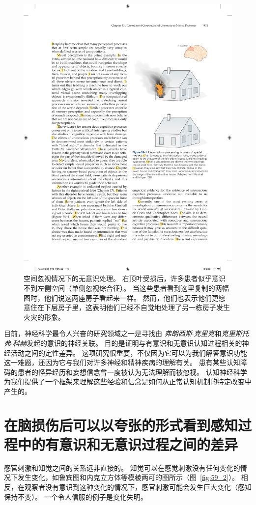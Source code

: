 \begin{figure}[htbp]
	\centering
	\includegraphics[width=0.6\linewidth]{chap59/fig_59_1}
	\caption{空间忽视情况下的无意识处理。
		右顶叶受损后，许多患者似乎意识不到左侧空间（单侧忽视综合征）。
		当这些患者看到这里复制的两幅图时，他们说这两座房子看起来一样。
		然而，他们也表示他们更愿意住在下层房子里，这表明他们已经不自觉地处理了另一栋房子发生火灾的形象\cite{marshall1988blindsight}。}
	\label{fig:59_1}
\end{figure}


目前，神经科学最令人兴奋的研究领域之一是寻找由 \textit{弗朗西斯$\cdot$克里克}和\textit{克里斯托弗$\cdot$科赫}发起的意识的神经关联。
目的是证明与有意识和无意识认知过程相关的神经活动之间的定性差异。
这项研究很重要，不仅因为它可以为我们解答意识功能这一难题，还因为它与我们对许多神经和精神疾病的理解有关。
患有某些认知障碍的患者的怪异经历和妄想信念曾一度被认为无法理解而被忽视。
认知神经科学为我们提供了一个框架来理解这些经验和信念是如何从正常认知机制的特定改变中产生的。



\section{在脑损伤后可以以夸张的形式看到感知过程中的有意识和无意识过程之间的差异}

感官刺激和知觉之间的关系远非直接的。
知觉可以在感觉刺激没有任何变化的情况下发生变化，如鲁宾图和内克立方体等模棱两可的图所示（图~\ref{fig:59_2}）。
相反，在观察者没有意识到这种变化的情况下，感官刺激可能会发生巨大变化（感知保持不变）。
一个令人信服的例子是变化失明。


